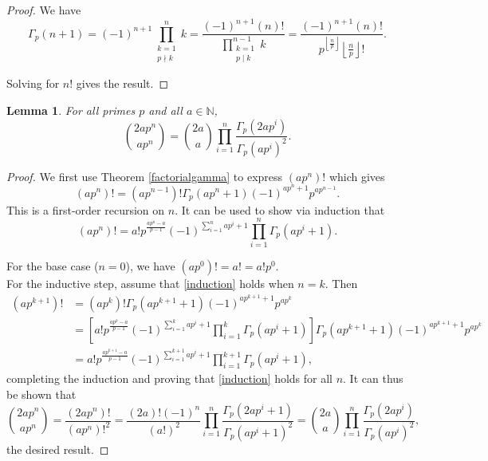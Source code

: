\documentclass[12pt, letter]{article}    %
\theoremstyle{plain}
\newtheorem{lemma}[theorem]{Lemma}
\theoremstyle{definition}
\numberwithin{equation}{section}
\newcommand{\thref}[1]{Theorem \ref{#1}}
\newcommand{\thlabel}[1]{\label{#1}}
\providecommand{\floor}[1]{\left \lfloor #1 \right \rfloor }
\begin{document}
\begin{proof} We have
$$\Gamma_p(n+1) =(-1)^{n+1}\prod_{\substack{k=1\\p\nmid k}}^{n} k 
=\frac{(-1)^{n+1}(n)!}{\prod\limits_{\substack{k=1\\p\mid k}}^{n-1} k} 
=\frac{(-1)^{n+1}(n)!}{p^{\floor{\frac{n}{p}}}\floor{\frac{n}{p}}!}.$$

Solving for $n!$ gives the result.
\end{proof}

\begin{lemma}\thlabel{primepowerfactorial}
For all primes $p$ and all $a\in\mathbb{N}$, $$\binom{2ap^n}{ap^n}=\binom{2a}{a}\prod\limits_{i=1}^n \frac{\Gamma_p(2ap^i)}{\Gamma_p(ap^i)^2}.$$
\end{lemma}

\begin{proof}
We first use \thref{factorialgamma} to express $(ap^n)!$ which gives
\begin{equation}
(ap^n)!  = (ap^{n-1})!\Gamma_p(ap^n+1)(-1)^{ap^n+1}p^{ap^{n-1}}.
\end{equation}
This is a first-order recursion on $n$. It can be used to show via induction that 
\begin{equation}\label{induction}
(ap^n)! = a!p^{\frac{ap^n-a}{p-1}}(-1)^{\sum_{i=1}^{n}ap^i+1}\prod_{i=1}^{n}\Gamma_p(ap^i+1).
\end{equation}

For the base case ($n=0$), we have $(ap^0)!=a!=a!p^0$. \\

For the inductive step, assume that \eqref{induction} holds when $n=k$. Then
\begin{equation*}
\begin{split}
(ap^{k+1})!&=(ap^k)!\Gamma_p(ap^{k+1}+1)(-1)^{ap^{k+1}+1}p^{ap^k}\\
&=\left[a!p^{\frac{ap^k-a}{p-1}}(-1)^{\sum_{i=1}^{k}ap^i+1}\prod_{i=1}^{k}\Gamma_p(ap^i+1)\right]\Gamma_p(ap^{k+1}+1)(-1)^{ap^{k+1}+1}p^{ap^k}\\
&= a!p^{\frac{ap^{k+1}-a}{p-1}}(-1)^{\sum_{i=1}^{k+1}ap^i+1}\prod_{i=1}^{k+1}\Gamma_p(ap^i+1), 
\end{split}
\end{equation*}
completing the induction and proving that \eqref{induction} holds for all $n$. It can thus be shown that
$$\binom{2ap^n}{ap^n}=\frac{(2ap^n)!}{(ap^n)!^2}=\frac{(2a)!(-1)^{n}}{(a!)^2}\prod_{i=1}^n \frac{\Gamma_p(2ap^i+1)}{\Gamma_p(ap^i+1)^2}=\binom{2a}{a}\prod_{i=1}^n \frac{\Gamma_p(2ap^i)}{\Gamma_p(ap^i)^2},$$
the desired result.\end{proof}
\end{document}
